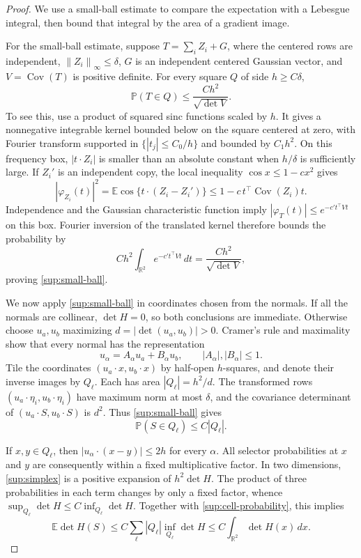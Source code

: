\documentclass[11pt,a4paper]{article}
\theoremstyle{remark}
\newcommand{\E}{\mathbb E}
\newcommand{\Pp}{\mathbb P}
\newcommand{\R}{\mathbb R}
\newcommand{\Cov}{\operatorname{Cov}}
\newcommand{\norm}[1]{\left\lVert#1\right\rVert}
\newcommand{\dd}{\,d}
\begin{document}
\begin{proof}
We use a small-ball estimate to compare the expectation with a
Lebesgue integral, then bound that integral by the area of a gradient
image.

For the small-ball estimate, suppose
\(T=\sum_iZ_i+G\), where the centered rows are independent,
\(\norm{Z_i}_\infty\le\delta\), \(G\) is an independent centered
Gaussian vector, and \(V=\Cov(T)\) is positive definite. For every
square \(Q\) of side \(h\ge C\delta\),
\begin{equation}
 \Pp(T\in Q)\le\frac{Ch^2}{\sqrt{\det V}}.
 \label{sup:small-ball}
\end{equation}
To see this, use a product of squared sinc functions scaled by \(h\).
It gives a nonnegative integrable kernel bounded below on the square
centered at zero, with Fourier transform supported in
\(\{|t_j|\le C_0/h\}\) and bounded by \(C_1h^2\).
On this frequency box, \(|t\cdot Z_i|\) is smaller than an absolute
constant when \(h/\delta\) is sufficiently large. If \(Z_i'\)
is an independent copy, the local inequality
\(\cos x\le1-cx^2\) gives
\[
 |\varphi_{Z_i}(t)|^2
 =\E\cos\{t\cdot(Z_i-Z_i')\}
 \le1-c\,t^\top\Cov(Z_i)t.
\]
Independence and the Gaussian characteristic function imply
\( |\varphi_T(t)|\le e^{-c't^\top Vt}\) on this box.
Fourier inversion of the translated kernel therefore bounds the
probability by
\[
 Ch^2\int_{\R^2}e^{-c't^\top Vt}\dd t
 =\frac{Ch^2}{\sqrt{\det V}},
\]
proving \eqref{sup:small-ball}.

We now apply \eqref{sup:small-ball} in coordinates chosen from the
normals. If all the normals are collinear, \(\det H=0\), so both
conclusions are immediate. Otherwise choose \(u_a,u_b\) maximizing
\(d=|\det(u_a,u_b)|>0\). Cramer's rule and maximality show that
every normal has the representation
\[
 u_\alpha=A_\alpha u_a+B_\alpha u_b,
 \qquad |A_\alpha|,|B_\alpha|\le1.
\]
Tile the coordinates \((u_a\cdot x,u_b\cdot x)\) by half-open
\(h\)-squares, and denote their inverse images by \(Q_\ell\).
Each has area \(|Q_\ell|=h^2/d\). The transformed rows
\((u_a\cdot\eta_i,u_b\cdot\eta_i)\) have maximum norm at most
\(\delta\), and the covariance determinant of
\((u_a\cdot S,u_b\cdot S)\) is \(d^2\). Thus
\eqref{sup:small-ball} gives
\begin{equation}
 \Pp(S\in Q_\ell)\le C|Q_\ell|.
 \label{sup:cell-probability}
\end{equation}

If \(x,y\in Q_\ell\), then
\(|u_\alpha\cdot(x-y)|\le2h\) for every \(\alpha\).
All selector probabilities at \(x\) and \(y\) are consequently
within a fixed multiplicative factor. In two dimensions,
\eqref{sup:simplex} is a positive expansion of \(h^2\det H\).
The product of three probabilities in each term changes by only a
fixed factor, whence
\(\sup_{Q_\ell}\det H\le C\inf_{Q_\ell}\det H\).
Together with \eqref{sup:cell-probability}, this implies
\begin{equation}
 \E\det H(S)
 \le C\sum_\ell |Q_\ell|\inf_{Q_\ell}\det H
 \le C\int_{\R^2}\det H(x)\dd x.
 \label{sup:curvature-integral}
\end{equation}


\end{proof}
\end{document}
